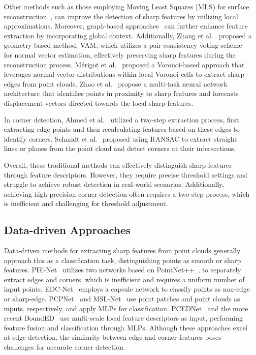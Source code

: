 \documentclass[lettersize,journal]{IEEEtran}
\begin{document}
Other methods such as those employing Moving Least Squares (MLS) for surface reconstruction~\cite{daniels_robust_2007}, can improve the detection of sharp features by utilizing local approximations. Moreover, graph-based approaches~\cite{guo_sglbp_2022} can further enhance feature extraction by incorporating global context. Additionally, Zhang et al.~\cite{zhang_multinormal_2019} proposed a geometry-based method, VAM, which utilizes a pair consistency voting scheme for normal vector estimation, effectively preserving sharp features during the reconstruction process. Mérigot et al.~\cite{merigot_voronoibased_2011} proposed a Voronoi-based approach that leverages normal-vector distributions within local Voronoi cells to extract sharp edges from point clouds. Zhao et al.~\cite{zhao_sharp_2023} propose a multi-task neural network architecture that identifies points in proximity to sharp features and forecasts displacement vectors directed towards the local sharp features.

In corner detection, Ahmed et al.~\cite{ahmed_edge_2018} utilized a two-step extraction process, first extracting edge points and then recalculating features based on these edges to identify corners. Schmidt et al.~\cite{schmidt_detection_2023} proposed using RANSAC to extract straight lines or planes from the point cloud and detect corners at their intersections.

Overall, these traditional methods can effectively distinguish sharp features through feature descriptors. However, they require precise threshold settings and struggle to achieve robust detection in real-world scenarios. Additionally, achieving high-precision corner detection often requires a two-step process, which is inefficient and challenging for threshold adjustment.

\subsection{Data-driven Approaches}
Data-driven methods for extracting sharp features from point clouds generally approach this as a classification task, distinguishing points as smooth or sharp features. PIE-Net~\cite{wang_pienet_2020a} utilizes two networks based on PointNet++~\cite{qi_pointnet_2017}, to separately extract edges and corners, which is inefficient and requires a uniform number of input points. EDC-Net~\cite{bazazian_edcnet_2021} employs a capsule network to classify points as non-edge or sharp-edge. PCPNet~\cite{guerrero_pcpnet_2018} and MSL-Net~\cite{jiao_mslnet_2024} use point patches and point clouds as inputs, respectively, and apply MLPs for classification. PCEDNet~\cite{himeur_pcednet_2022} and the more recent BoundED~\cite{bode_bounded_2023} use multi-scale local feature descriptors as input, performing feature fusion and classification through MLPs. Although these approaches excel at edge detection, the similarity between edge and corner features poses challenges for accurate corner detection.
\end{document}
